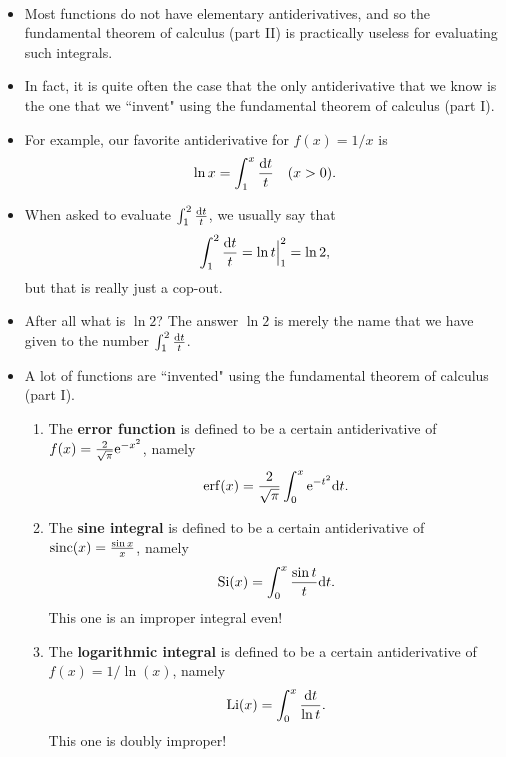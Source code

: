 

\begin{remark}\,
\begin{itemize}
\item 
Most functions do not have elementary antiderivatives, and so the fundamental theorem of calculus (part II) is practically useless for evaluating such integrals.
\item In fact, it is quite often the case that the only antiderivative that we know is the one that we ``invent" using the fundamental theorem of calculus (part I).
\item For example, our favorite antiderivative for $f(x)=1/x$ is 
\begin{equation*}
\ln x = \int_1^x\frac{\mathrm{d} t}{t} \quad (x>0).
\end{equation*}
\item When asked to evaluate $\int_1^2\frac{\mathrm{d} t}{t}$, we usually say that
\begin{equation*}
\int_1^2\frac{\mathrm{d} t}{t} = \ln t\Big|_1^2 = \ln 2,
\end{equation*}
but that is really just a cop-out. 
\item After all what is $\ln 2$?  The answer $\ln 2$ is merely the name that we have given to the number 
$\int_1^2\frac{\mathrm{d} t}{t}$.
\item A lot of functions are ``invented" using the fundamental theorem of calculus (part I).
\begin{enumerate}
\item The \textbf{error function} is defined to be a certain antiderivative of $f(x) = \frac{2}{\sqrt\pi}\mathrm{e}^{-x^2}$, namely
\begin{equation*}
\operatorname{erf} (x) = \frac{2}{\sqrt\pi}\int_0^x\mathrm{e}^{-t^2}\mathrm{d} t.
\end{equation*}
\item The \textbf{sine integral} is defined to be a certain antiderivative of $\operatorname{sinc}(x) = \frac{\sin x}{x}$, namely
\begin{equation*}
\operatorname{Si}(x) = \int_0^x\frac{\sin t}{t}\mathrm{d} t.
\end{equation*}
This one is an improper integral even!
\item The \textbf{logarithmic integral} is defined to be a certain antiderivative of $f(x) = 1/\ln (x)$, namely
\begin{equation*}
\operatorname{Li}(x) = \int_0^x\frac{\mathrm{d} t}{\ln t}.
\end{equation*}
This one is doubly improper!
\end{enumerate}
\end{itemize}
\end{remark}


